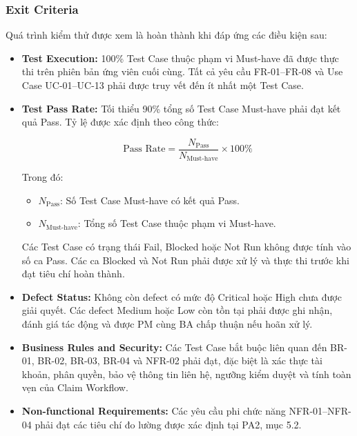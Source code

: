\subsubsection*{Exit Criteria}

Quá trình kiểm thử được xem là hoàn thành khi 
đáp ứng các điều kiện sau:

\begin{itemize}
    \item \textbf{Test Execution:}
    100\% Test Case thuộc phạm vi Must-have đã được 
    thực thi trên phiên bản ứng viên cuối cùng. 
    Tất cả yêu cầu FR-01--FR-08 và Use Case 
    UC-01--UC-13 phải được truy vết đến ít nhất 
    một Test Case.

    \item \textbf{Test Pass Rate:}
    Tối thiểu 90\% tổng số Test Case Must-have 
    phải đạt kết quả Pass. Tỷ lệ được xác định 
    theo công thức:

    \[
        \text{Pass Rate} =
        \frac{N_{\text{Pass}}}
        {N_{\text{Must-have}}}
        \times 100\%
    \]

    Trong đó:
    \begin{itemize}
        \item $N_{\text{Pass}}$: Số Test Case 
        Must-have có kết quả Pass.
        
        \item $N_{\text{Must-have}}$: Tổng số 
        Test Case thuộc phạm vi Must-have.
    \end{itemize}

    Các Test Case có trạng thái Fail, Blocked 
    hoặc Not Run không được tính vào số ca Pass. 
    Các ca Blocked và Not Run phải được xử lý 
    và thực thi trước khi đạt tiêu chí hoàn thành.

    \item \textbf{Defect Status:}
    Không còn defect có mức độ Critical hoặc High 
    chưa được giải quyết. Các defect Medium hoặc Low 
    còn tồn tại phải được ghi nhận, đánh giá tác động 
    và được PM cùng BA chấp thuận nếu hoãn xử lý.

    \item \textbf{Business Rules and Security:}
    Các Test Case bắt buộc liên quan đến BR-01, 
    BR-02, BR-03, BR-04 và NFR-02 phải đạt, 
    đặc biệt là xác thực tài khoản, phân quyền, 
    bảo vệ thông tin liên hệ, ngưỡng kiểm duyệt 
    và tính toàn vẹn của Claim Workflow.

    \item \textbf{Non-functional Requirements:}
    Các yêu cầu phi chức năng NFR-01--NFR-04 
    phải đạt các tiêu chí đo lường được xác định 
    tại PA2, mục 5.2.


\end{itemize}
